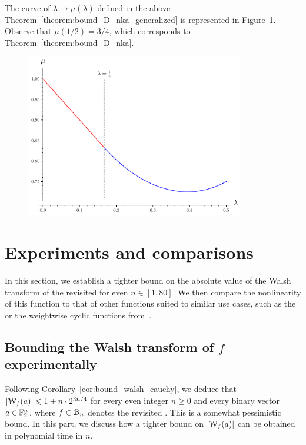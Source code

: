 \documentclass[11pt]{llncs}
\begin{document}
The curve of $\lambda\mapsto\mu(\lambda)$ defined in the above Theorem~\ref{theorem:bound_D_nka_generalized} is represented in Figure~\ref{fig:curve_exponents_lambda_mu}. Observe that $\mu(1/2)=3/4$, which corresponds to Theorem~\ref{theorem:bound_D_nka}.

\begin{figure}[ht]
	\centering
	\includegraphics[width=9.5cm]{curve_exponents_lambda_mu.pdf}
    \vspace{-5mm}
	\label{fig:curve_exponents_lambda_mu}
\end{figure}

\section{Experiments and comparisons}\label{sec:expAndComp}

In this section, we establish a tighter bound on the absolute value of the Walsh transform of the revisited \hwbf{} for even $n\in[1,80]$. 
We then compare the nonlinearity of this function to that of other functions suited to similar use cases, such as the \hwbf{} or the weightwise cyclic functions from~\cite{DAM:MeaOza24}.

\subsection{Bounding the Walsh transform of $f$ experimentally}\label{sec:expwt}

Following Corollary~\ref{cor:bound_walsh_cauchy}, we deduce that $|\mathcal W_{f}(a)|\leqslant 1+n\cdot 2^{3n/4}$ for every even integer $n\geq 0$ and every binary vector $a\in\mathbb{F}_2^n$, where $f\in\mathcal{B}_n$ denotes the revisited \hwbf{}. This is a somewhat pessimistic bound. In this part, we discuss how a tighter bound on $|\mathcal W_{f}(a)|$ can be obtained in polynomial time in $n$.
\end{document}
